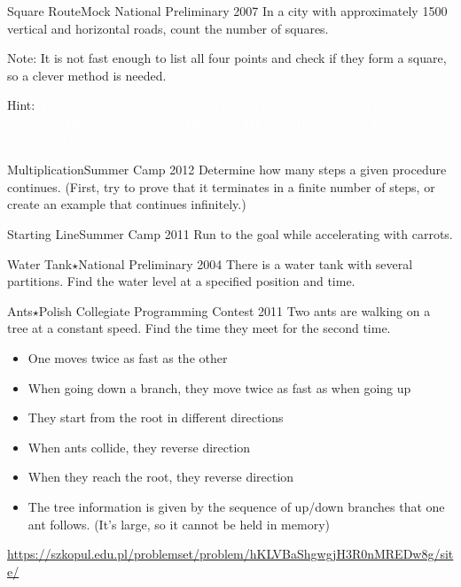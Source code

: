 \begin{pbox}{Square Route}{Mock National Preliminary 2007}
In a city with approximately 1500 vertical and horizontal roads, count the number of squares.

\end{pbox}

Note: It is not fast enough to list all four points and check if they form a square, so a clever method is needed.

Hint: \textcolor{white}{The types of vertical lengths and horizontal lengths can each be found quickly. Is there a way to record them in a \texttt{map} and utilize them? (There are other ways to solve it)}

\begin{pbox}{Multiplication}{Summer Camp 2012}
Determine how many steps a given procedure continues.
(First, try to prove that it terminates in a finite number of steps, or create an example that continues infinitely.)

\end{pbox}

\begin{pbox}{Starting Line}{Summer Camp 2011}
  Run to the goal while accelerating with carrots.

\end{pbox}

\begin{pbox}{Water Tank$\star$}{National Preliminary 2004}
There is a water tank with several partitions. Find the water level at a specified position and time.

\end{pbox}

\begin{pbox}{Ants$\star$}{Polish Collegiate Programming Contest 2011}
Two ants are walking on a tree at a constant speed.
Find the time they meet for the second time.

\begin{itemize}
\setlength{\itemsep}{0pt}
\item One moves twice as fast as the other
\item When going down a branch, they move twice as fast as when going up
\item They start from the root in different directions
\item When ants collide, they reverse direction
\item When they reach the root, they reverse direction 
\item The tree information is given by the sequence of up/down branches that one ant follows. (It's large, so it cannot be held in memory)
\end{itemize}

\url{https://szkopul.edu.pl/problemset/problem/hKLVBaShgwgjH3R0nMREDw8g/site/}
\end{pbox}

